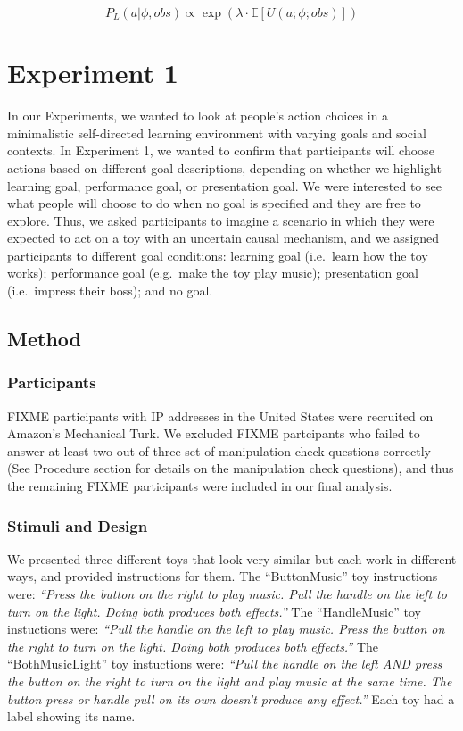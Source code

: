 \documentclass[10pt, letterpaper]{article}
\begin{document}
\[ P_L(a | \phi, obs) \propto \exp(\lambda \cdot \mathbb{E}[U(a;\phi; obs)])\]

\section{Experiment 1}\label{experiment-1}

In our Experiments, we wanted to look at people's action choices in a
minimalistic self-directed learning environment with varying goals and
social contexts. In Experiment 1, we wanted to confirm that participants
will choose actions based on different goal descriptions, depending on
whether we highlight learning goal, performance goal, or presentation
goal. We were interested to see what people will choose to do when no
goal is specified and they are free to explore. Thus, we asked
participants to imagine a scenario in which they were expected to act on
a toy with an uncertain causal mechanism, and we assigned participants
to different goal conditions: learning goal (i.e.~learn how the toy
works); performance goal (e.g.~make the toy play music); presentation
goal (i.e.~impress their boss); and no goal.

\subsection{Method}\label{method}

\subsubsection{Participants}\label{participants}

FIXME participants with IP addresses in the United States were recruited
on Amazon's Mechanical Turk. We excluded FIXME partcipants who failed to
answer at least two out of three set of manipulation check questions
correctly (See Procedure section for details on the manipulation check
questions), and thus the remaining FIXME participants were included in
our final analysis.

\subsubsection{Stimuli and Design}\label{stimuli-and-design}

We presented three different toys that look very similar but each work
in different ways, and provided instructions for them. The
``ButtonMusic'' toy instructions were: \emph{``Press the button on the
right to play music. Pull the handle on the left to turn on the light.
Doing both produces both effects.''} The ``HandleMusic'' toy instuctions
were: \emph{``Pull the handle on the left to play music. Press the
button on the right to turn on the light. Doing both produces both
effects.''} The ``BothMusicLight'' toy instuctions were: \emph{``Pull
the handle on the left AND press the button on the right to turn on the
light and play music at the same time. The button press or handle pull
on its own doesn't produce any effect.''} Each toy had a label showing
its name.
\end{document}
